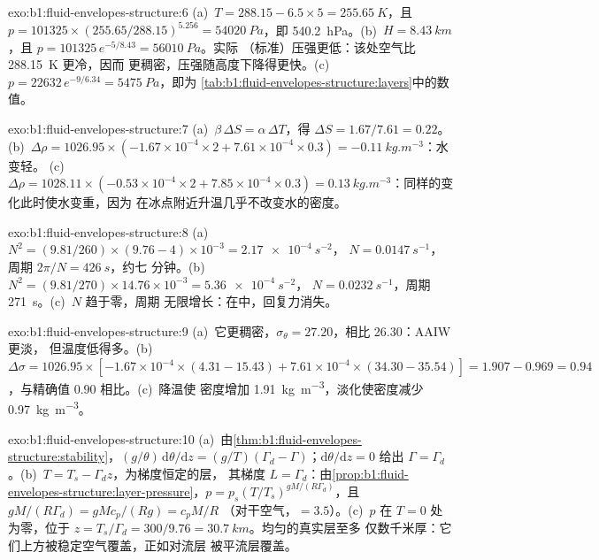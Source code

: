 \begin{solution}{exo:b1:fluid-envelopes-structure:6}
(a)~$T = 288.15 - 6.5 \times 5 = \qty{255.65}{K}$，且 $p = \num{101325} \times
(255.65/288.15)^{5.256} = \qty{54020}{Pa}$，即 \qty{540.2}{hPa}。(b)~$H =
\qty{8.43}{km}$，且 $p = \num{101325}\,e^{-5/8.43} = \qty{56010}{Pa}$。实际
（标准）压强更低：该处空气比 \qty{288.15}{K} 更冷，因而
更稠密，压强随高度下降得更快。(c)~$p = \num{22632}\,
e^{-9/6.34} = \qty{5475}{Pa}$，即为
\cref{tab:b1:fluid-envelopes-structure:layers}中的数值。
\end{solution}

\begin{solution}{exo:b1:fluid-envelopes-structure:7}
(a)~$\beta\,\Delta S = \alpha\,\Delta T$，得 $\Delta S = 1.67/7.61 = 0.22$。
(b)~$\Delta\rho = 1026.95 \times (-1.67\times10^{-4} \times 2 + 7.61\times10^{-4}
\times 0.3) = \qty{-0.11}{kg.m^{-3}}$：水变轻。
(c)~$\Delta\rho = 1028.11 \times (-0.53\times10^{-4} \times 2 + 7.85\times10^{-4}
\times 0.3) = \qty{+0.13}{kg.m^{-3}}$：同样的变化此时使水变重，因为
在冰点附近升温几乎不改变水的密度。
\end{solution}

\begin{solution}{exo:b1:fluid-envelopes-structure:8}
(a)~$N^2 = (9.81/260) \times (9.76 - 4)\times10^{-3} = \qty{2.17e-4}{s^{-2}}$，
$N = \qty{0.0147}{s^{-1}}$，周期 $2\pi/N = \qty{426}{s}$，约七
分钟。(b)~$N^2 = (9.81/270) \times 14.76\times10^{-3} = \qty{5.36e-4}{s^{-2}}$，
$N = \qty{0.0232}{s^{-1}}$，周期 \qty{271}{s}。(c)~$N$ 趋于零，周期
无限增长：在中，回复力消失。
\end{solution}

\begin{solution}{exo:b1:fluid-envelopes-structure:9}
(a)~它更稠密，$\sigma_\theta = 27.20$，相比 26.30：AAIW 更淡，
但温度低得多。(b)~$\Delta\sigma = 1026.95 \times [-1.67\times10^{-4} \times
(4.31 - 15.43) + 7.61\times10^{-4} \times (34.30 - 35.54)] = 1.907 - 0.969 =
0.94$，与精确值 $0.90$ 相比。(c)~降温使
密度增加 \qty{1.91}{kg.m^{-3}}，淡化使密度减少 \qty{0.97}{kg.m^{-3}}。
\end{solution}

\begin{solution}{exo:b1:fluid-envelopes-structure:10}
(a)~由\cref{thm:b1:fluid-envelopes-structure:stability}，$(g/\theta)\,\mathrm
d\theta/\mathrm dz = (g/T)(\Gamma_d - \Gamma)$；$\mathrm d\theta/\mathrm dz = 0$
给出 $\Gamma = \Gamma_d$。(b)~$T = T_s - \Gamma_d z$，为梯度恒定的层，
其梯度 $L = \Gamma_d$：由\cref{prop:b1:fluid-envelopes-structure:layer-pressure}，$p =
p_s (T/T_s)^{gM/(R\Gamma_d)}$，且 $gM/(R\Gamma_d) = gMc_p/(Rg) = c_pM/R$
（对干空气，$= 3.5$）。(c)~$p$ 在 $T = 0$ 处为零，位于 $z = T_s/\Gamma_d =
300/9.76 = \qty{30.7}{km}$。均匀的真实层至多
仅数千米厚：它们上方被稳定空气覆盖，正如对流层
被平流层覆盖。
\end{solution}

